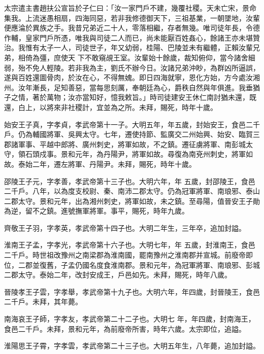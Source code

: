 \begin{pinyinscope}
 太宗遣主書趙扶公宣旨於子仁曰：「汝一家門戶不建，幾覆社稷。天未亡宋，景命集我。上流迷愚相扇，四海同惡，若非我修德御天下，三祖基業，一朝墜地，汝輩便應淪於異族之手。我昔兄弟近二十人，零落相繼，存者無幾。唯司徒年長，令德作輔，皇家門戶所憑，唯我與司徒二人而已，尚未能厭百姓姦心，餘諸王亦未堪贊治。我惟有太子一人，司徒世子，年又幼弱，桂陽、巴陵並未有繼體，正賴汝輩兄弟，相倚為彊，庶使天
 下不敢窺覘王室。汝輩始十餘歲，裁知俯仰，當今諸舍細弱，殆不免人輕陵。若非我為主，劉氏不辦今日。汝諸兄弟沖眇，為群凶所逼誤，遂與百姓還圖骨肉，於汝在心，不得無媿。即日四海就寧，恩化方始，方今處汝湘州。汝年漸長，足知善惡，當每思刻厲，奉朝廷為心，爵秩自然與年俱進。我垂猶子之情，著於萬物；汝亦當知好，憶我敕旨。」時司徒建安王休仁南討猶未還，既還，白上，以將來非社稷計，宜並為之所。未拜，賜死，時年十歲。



 始安王子真，字孝貞，孝武帝第十一子。大明五年，年五歲，封始安王，食邑二千戶。仍為輔國將軍、吳興太守。七年，遷使持節、監廣交二州始興、始安、臨賀三郡諸軍事、平越中郎將、廣州刺史，將軍如故，不之鎮。遷征虜將軍、南彭城太守，領石頭戍事。景和元年，為丹陽尹，將軍如故。尋復為南兗州刺史，將軍如故。泰始二年，遷左將軍、丹陽尹。未拜，賜死，時年十歲。



 邵陵王子元，字孝善，孝武帝第十三子也。大明六年，年
 五歲，封邵陵王，食邑二千戶。八年，以為度支校尉、秦、南沛二郡太守。仍為冠軍將軍、南琅邪、泰山二郡太守。景和元年，出為湘州刺史，將軍如故，未之鎮。至尋陽，值晉安王子勛為逆，留不之鎮。進號撫軍將軍。事平，賜死，時年九歲。



 齊敬王子羽，字孝英，孝武帝第十四子也。大明二年生，三年卒，追加封謚。



 淮南王子孟，字孝光，孝武帝第十六子也。大明七年，年
 五歲，封淮南王，食邑二千戶。時世祖改豫州之南梁郡為淮南國，罷南豫州之淮南郡并宣城。前廢帝即位，二郡並復舊，子孟仍國名度食淮南郡。景和元年，為冠軍將軍、南琅邪、彭城二郡太守。泰始二年，改封安成王，戶邑如先。未拜，賜死，時年八歲。



 晉陵孝王子雲，字孝舉，孝武帝第十九子也。大明六年，年四歲，封晉陵王，食邑二千戶。未拜，其年薨。



 南海哀王子師，字孝友，孝武帝第二十二子也。大明七
 年，年四歲，封南海王，食邑二千戶。未拜，景和元年，為前廢帝所害，時年六歲。太宗即位，追謚。



 淮陽思王子霄，字孝雲，孝武帝第二十三子也。大明五年生，八年薨，追加封謚。




\end{pinyinscope}
